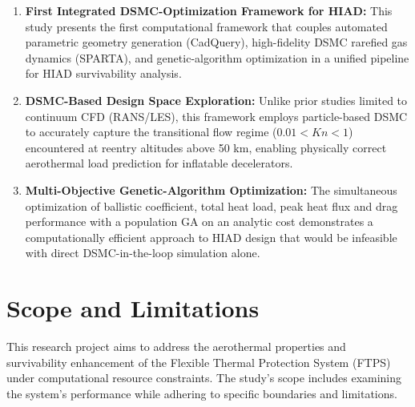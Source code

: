 \begin{enumerate}
    \item \textbf{First Integrated DSMC-Optimization Framework for HIAD:} This study presents the first computational framework that couples automated parametric geometry generation (CadQuery), high-fidelity DSMC rarefied gas dynamics (SPARTA), and genetic-algorithm optimization in a unified pipeline for HIAD survivability analysis.

    \item \textbf{DSMC-Based Design Space Exploration:} Unlike prior studies limited to continuum CFD (RANS/LES), this framework employs particle-based DSMC to accurately capture the transitional flow regime ($0.01 < Kn < 1$) encountered at reentry altitudes above 50 km, enabling physically correct aerothermal load prediction for inflatable decelerators.


    \item \textbf{Multi-Objective Genetic-Algorithm Optimization:} The simultaneous optimization of ballistic coefficient, total heat load, peak heat flux and drag performance with a population GA on an analytic cost demonstrates a computationally efficient approach to HIAD design that would be infeasible with direct DSMC-in-the-loop simulation alone.
\end{enumerate}

\section{Scope and Limitations}

This research project aims to address the aerothermal properties and survivability enhancement of the Flexible Thermal Protection System (FTPS) under computational resource constraints. The study's scope includes examining the system's performance while adhering to specific boundaries and limitations.

